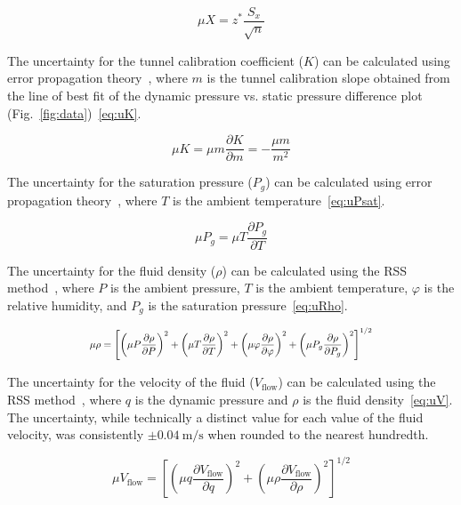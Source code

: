 \documentclass[journal,letterpaper]{IEEEtran}
\begin{document}
\begin{equation} \label{eq:conf}
    \mu X = z^* \frac{S_x}{\sqrt{n}}
\end{equation}

The uncertainty for the tunnel calibration coefficient ($K$) can be calculated using error propagation theory~\cite{errorprop}, where $m$ is the tunnel calibration slope obtained from the line of best fit of the dynamic pressure vs. static pressure difference plot (Fig.~\ref{fig:data})~\eqref{eq:uK}.

\begin{equation} \label{eq:uK}
    \mu K = \mu m \frac{\partial K}{\partial m} = -\frac{\mu m}{m^2}
\end{equation}

The uncertainty for the saturation pressure ($P_g$) can be calculated using error propagation theory~\cite{errorprop}, where $T$ is the ambient temperature~\eqref{eq:uPsat}.

\begin{equation} \label{eq:uPsat}
    \mu P_g = \mu T \frac{\partial P_g}{\partial T}
\end{equation}

The uncertainty for the fluid density ($\rho$) can be calculated using the RSS method~\cite{MoMLecture}, where $P$ is the ambient pressure, $T$ is the ambient temperature, $\varphi$ is the relative humidity, and $P_g$ is the saturation pressure~\eqref{eq:uRho}.

\begin{equation} \label{eq:uRho}
    \resizebox{227pt}{!}{$\displaystyle{\mu \rho = \left[\left(\mu P \frac{\partial \rho}{\partial P}\right)^2 + \left(\mu T \frac{\partial \rho}{\partial T}\right)^2 + \left(\mu \varphi \frac{\partial \rho}{\partial \varphi}\right)^2 + \left(\mu P_g \frac{\partial \rho}{\partial P_g}\right)^2\right]^{1/2}}$}
\end{equation}

The uncertainty for the velocity of the fluid ($V_\text{flow}$) can be calculated using the RSS method~\cite{MoMLecture}, where $q$ is the dynamic pressure and $\rho$ is the fluid density~\eqref{eq:uV}.
The uncertainty, while technically a distinct value for each value of the fluid velocity, was consistently $\pm \qty{0.04}{\m\per\s}$ when rounded to the nearest hundredth.

\begin{equation} \label{eq:uV}
    \mu V_\text{flow} = \left[\left(\mu q \frac{\partial V_\text{flow}}{\partial q}\right)^2 + \left(\mu \rho \frac{\partial V_\text{flow}}{\partial \rho}\right)^2\right]^{1/2}
\end{equation}
\end{document}
